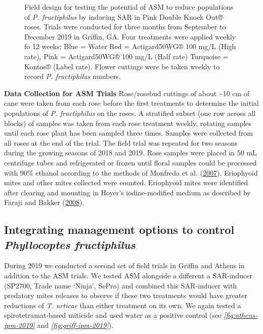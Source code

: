 \documentclass{ufdissertation}[overrideChapters] %
\begin{document}
{\begin{figure}
\caption[Field design for testing the potential of ASM to reduce populations of \textit{P. fructiphilus}]{Field design for testing the potential of ASM to reduce populations of \textit{P. fructiphilus} by inducing SAR in Pink Double Knock Out® roses. Trials were conducted for three months from September to December 2019 in Griffin, GA. Four treatments were applied weekly fo 12 weeks: Blue = Water Red = Actigard50WG® 100 \si{\milli\gram}/L (High rate),  Pink = Actigard50WG® 100 \si{\milli\gram}/L (Half rate) Turquoise = Kontos® (Label rate). Flower cuttings were be taken weekly to record \textit{P. fructiphilus} numbers.}\label{fig:grif-asm-2019}
\end{figure}
\textbf{Data Collection for ASM Trials}
Rose/rosebud cuttings of about \textasciitilde10 cm of cane were taken from each rose before the first treatments to determine the initial populations of \emph{P. fructiphilus} on the roses. A stratified subset (one row across all blocks) of samples was taken from each rose treatment weekly, rotating samples until each rose plant has been sampled three times. Samples were collected from all roses at the end of the trial. The field trial was repeated for two seasons during the growing seasons of 2018 and 2019. Rose samples were placed in 50 mL centrifuge tubes and refrigerated or frozen until floral samples could be processed with 90\% ethanol according to the methods of Monfreda et al. (\protect\hyperlink{ref-Monfreda2007}{2007}). Eriophyoid mites and other mites collected were counted. Eriophyoid mites were identified after clearing and mounting in Hoyer's iodine-modified medium as described by Faraji and Bakker (\protect\hyperlink{ref-Faraji2008}{2008}).

\hypertarget{integrating-management-options-to-control-phyllocoptes-fructiphilus}{%
\subsection{\texorpdfstring{Integrating management options to control \emph{Phyllocoptes fructiphilus}}{Integrating management options to control Phyllocoptes fructiphilus}}\label{integrating-management-options-to-control-phyllocoptes-fructiphilus}}

During 2019 we conducted a second set of field trials in Griffin and Athens in addition to the ASM trials. We tested ASM alongside a different a SAR-inducer (SP2700, Trade name `Ninja', SePro) and combined this SAR-inducer with predatory mites releases to observe if these two treatments would have greater reductions of \emph{T. urticae} than either treatment on its own. We again tested a spirotetramat-based miticide and used water as a positive control (see \emph{\ref{fig:athens-ipm-2019}} and \emph{\ref{fig:griff-ipm-2019}}).

}
\end{document}
